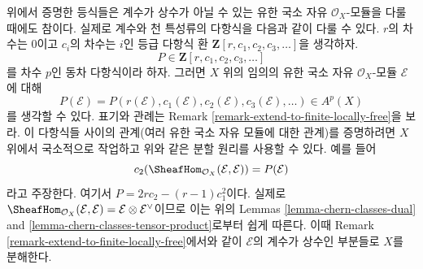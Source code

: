 \begin{remark}
\label{remark-equalities-nonconstant-rank}
위에서 증명한 등식들은 계수가 상수가 아닐 수 있는 유한 국소 자유
$\mathcal{O}_X$-모듈을 다룰 때에도 참이다. 실제로 계수와 천 특성류의
다항식을 다음과 같이 다룰 수 있다. $r$의 차수는 $0$이고 $c_i$의
차수는 $i$인 등급 다항식 환
$\mathbf{Z}[r, c_1, c_2, c_3, \ldots]$을 생각하자.
$$
P \in \mathbf{Z}[r, c_1, c_2, c_3, \ldots]
$$
를 차수 $p$인 동차 다항식이라 하자. 그러면 $X$ 위의 임의의 유한 국소
자유 $\mathcal{O}_X$-모듈 $\mathcal{E}$에 대해
$$
P(\mathcal{E}) =
P(r(\mathcal{E}), c_1(\mathcal{E}), c_2(\mathcal{E}), c_3(\mathcal{E}), \ldots)
\in A^p(X)
$$
를 생각할 수 있다. 표기와 관례는 Remark
\ref{remark-extend-to-finite-locally-free}을 보라. 이 다항식들 사이의
관계(여러 유한 국소 자유 모듈에 대한 관계)를 증명하려면 $X$ 위에서
국소적으로 작업하고 위와 같은 분할 원리를 사용할 수 있다. 예를 들어
$$
c_2(\SheafHom_{\mathcal{O}_X}(\mathcal{E}, \mathcal{E})) =
P(\mathcal{E})
$$
라고 주장한다. 여기서 $P = 2rc_2 - (r - 1)c_1^2$이다. 실제로
$\SheafHom_{\mathcal{O}_X}(\mathcal{E}, \mathcal{E}) =
\mathcal{E} \otimes \mathcal{E}^\vee$이므로 이는 위의 Lemmas
\ref{lemma-chern-classes-dual} and
\ref{lemma-chern-classes-tensor-product}로부터 쉽게 따른다. 이때
Remark \ref{remark-extend-to-finite-locally-free}에서와 같이
$\mathcal{E}$의 계수가 상수인 부분들로 $X$를 분해한다.
\end{remark}

